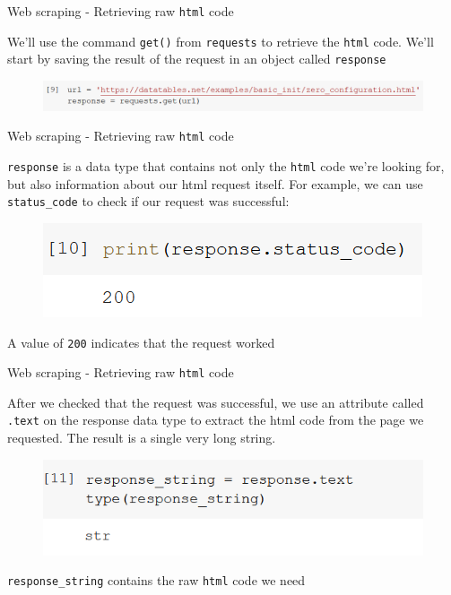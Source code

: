 \documentclass[aspectratio=169]{beamer}
\begin{document}
\begin{frame}{Web scraping - Retrieving raw \texttt{html} code}

	We'll use the command \texttt{get()} from \texttt{requests} to retrieve the \texttt{html} code. We'll start by saving the result of the request in an object called \texttt{response}

	\begin{figure}
		\centering
		\includegraphics[width=\linewidth]{img/response.png}
	\end{figure}

\end{frame}

\begin{frame}{Web scraping - Retrieving raw \texttt{html} code}

	\texttt{response} is a data type that contains not only the \texttt{html} code we're looking for, but also information about our html request itself. For example, we can use \texttt{status\_code} to check if our request was successful:

	\begin{figure}
		\centering
		\includegraphics[width=0.4\linewidth]{img/status_code.png}
	\end{figure}

	A value of \texttt{200} indicates that the request worked

\end{frame}

\begin{frame}{Web scraping - Retrieving raw \texttt{html} code}

	After we checked that the request was successful, 
	we use an attribute called \texttt{.text} on the response data type 
	to extract the html code from the page we requested. 
	The result is a single very long string.

	\begin{figure}
		\centering
		\includegraphics[width=0.4\linewidth]{img/response_string.png}
	\end{figure}

	\texttt{response\_string} contains the raw \texttt{html} code we need

\end{frame}
\end{document}

